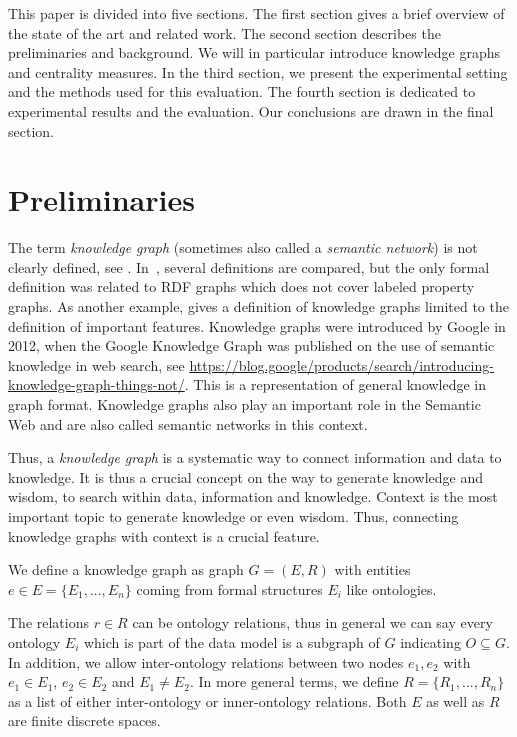 This paper is divided into five sections. The first section gives a brief overview of the state of the art and related work. The second section describes the preliminaries and background. We will in particular introduce knowledge graphs and centrality measures. In the third section, we present the experimental setting and the methods used for this evaluation. The fourth section is dedicated to experimental results and the evaluation. Our conclusions are drawn in the final section.

\section{Preliminaries}

The term \emph{knowledge graph} (sometimes also called a \emph{semantic network}) is not clearly defined, see \cite{Fensel2020}. In~\cite{ehrlinger2016towards},  several definitions are compared, but the only formal definition was related to RDF graphs which does not cover labeled property graphs. As another example, \cite{paulheim2017knowledge} gives a definition of knowledge graphs limited to the definition of important features. Knowledge graphs were introduced by Google in 2012, when the Google Knowledge Graph was published on the use of semantic knowledge in web search, see \url{https://blog.google/products/search/introducing-knowledge-graph-things-not/}. This is a representation of general knowledge in graph format. Knowledge graphs also play an important role in the Semantic Web and are also called semantic networks in this context.

Thus, a \emph{knowledge graph} is a systematic way to connect information and data to knowledge. It is thus a crucial concept on the way to generate knowledge and wisdom, to search within data, information and knowledge. Context is the most important topic to generate knowledge or even wisdom. Thus, connecting knowledge graphs with context is a crucial feature. 

\begin{definition}\label{def:kg}
We define a knowledge graph as graph $G=(E,R)$ with entities $e\in E=\{E_1,...,E_n\}$ coming from formal structures $E_i$ like ontologies. 
\end{definition}

The relations $r\in R$ can be ontology relations, thus in general we can say every ontology $E_i$ which is part of the data model is a subgraph of $G$ indicating $O\subseteq G$. In addition, we allow inter-ontology relations between two nodes $e_1, e_2$ with $e_1 \in E_1$, $e_2 \in E_2$ and $E_1 \neq E_2$. In more general terms, we define $R=\{R_1,...,R_n\}$ as a list of either inter-ontology or inner-ontology relations. Both $E$ as well as $R$ are finite discrete spaces.

